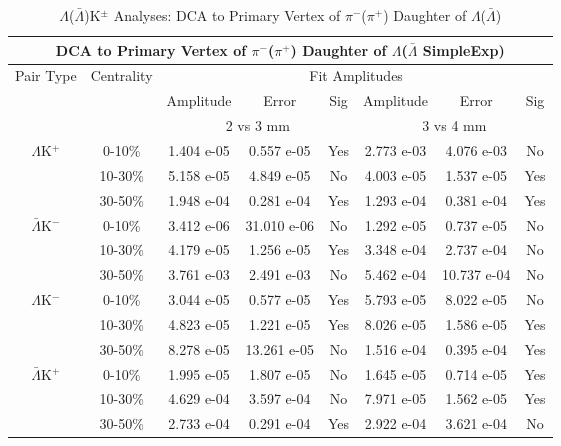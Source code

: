 \documentclass[../AnalysisNoteJBuxton.tex]{subfiles}
\begin{document}
\begin{table}
 \centering
 \begin{tabular}{|c|c|c|c|c||c|c|c|}
  \multicolumn{8}{c}{DCA to Primary Vertex of $\pi^{-}$($\pi^{+}$) Daughter of $\Lambda$($\bar{\Lambda}$ SimpleExp)} \\
  \hline
  \multirow{3}{*}{Pair Type} & \multirow{3}{*}{Centrality} & \multicolumn{6}{c|}{Fit Amplitudes} \\
  \cline{3-8}
   & & Amplitude & Error & Sig & Amplitude & Error & Sig \\  
  \cline{3-8}
   & & \multicolumn{3}{c||}{2 vs 3 mm} & \multicolumn{3}{c|}{3 vs 4 mm} \\  
  \hline
  \multirow{3}{*}{$\Lambda$K$^{+}$}
   &  0-10\% & 1.404 e-05 & 0.557 e-05 & Yes & 2.773 e-03 & 4.076 e-03 & No \\
   & 10-30\% & 5.158 e-05 & 4.849 e-05 & No & 4.003 e-05 & 1.537 e-05 & Yes \\
   & 30-50\% & 1.948 e-04 & 0.281 e-04 & Yes & 1.293 e-04 & 0.381 e-04 & Yes \\
  \hline
  \multirow{3}{*}{$\bar{\Lambda}$K$^{-}$}
   &  0-10\% & 3.412 e-06 & 31.010 e-06 & No & 1.292 e-05 & 0.737 e-05 & No \\
   & 10-30\% & 4.179 e-05 & 1.256 e-05 & Yes & 3.348 e-04 & 2.737 e-04 & No \\
   & 30-50\% & 3.761 e-03 & 2.491 e-03 & No & 5.462 e-04 & 10.737 e-04 & No \\
  \hline \hline
  \multirow{3}{*}{$\Lambda$K$^{-}$}
   &  0-10\% & 3.044 e-05 & 0.577 e-05 & Yes & 5.793 e-05 & 8.022 e-05 & No \\
   & 10-30\% & 4.823 e-05 & 1.221 e-05 & Yes & 8.026 e-05 & 1.586 e-05 & Yes \\
   & 30-50\% & 8.278 e-05 & 13.261 e-05 & No & 1.516 e-04 & 0.395 e-04 & Yes \\
  \hline
  \multirow{3}{*}{$\bar{\Lambda}$K$^{+}$}
   &  0-10\% & 1.995 e-05 & 1.807 e-05 & No & 1.645 e-05 & 0.714 e-05 & Yes \\
   & 10-30\% & 4.629 e-04 & 3.597 e-04 & No & 7.971 e-05 & 1.562 e-05 & Yes \\
   & 30-50\% & 2.733 e-04 & 0.291 e-04 & Yes & 2.922 e-04 & 3.621 e-04 & No \\
  \hline
 \end{tabular}
 \caption{$\Lambda$($\bar{\Lambda}$)K$^{\pm}$ Analyses: DCA to Primary Vertex of $\pi^{-}$($\pi^{+}$) Daughter of $\Lambda$($\bar{\Lambda}$)}
 \label{tab:DcaToPrimVertexPionDaughtOfLamLamKch_SimpleExp}
\end{table}
\end{document}
